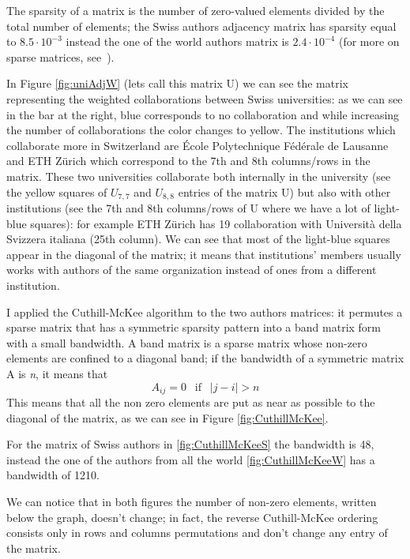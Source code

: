 \documentclass[]{usiinfbachelorproject}
\begin{document}
The sparsity of a matrix is the number of zero-valued elements divided by the total number of elements; the Swiss authors adjacency matrix has sparsity equal to $8.5 \cdot 10^{-3}$ instead the one of the world authors matrix is $2.4 \cdot 10^{-4}$ (for more on sparse matrices, see~\cite[Chapter 3]{saad}).

In Figure \ref{fig:uniAdjW} (lets call this matrix U) we can see the matrix representing the weighted collaborations between Swiss universities: as we can see in the bar at the right, blue corresponds to no collaboration and while increasing the number of collaborations the color changes to yellow.
The institutions which collaborate more in Switzerland are \'{E}cole Polytechnique F\'{e}d\'{e}rale de Lausanne and ETH Z\"{u}rich which correspond to the 7th and 8th columns/rows in the matrix. These two universities collaborate both internally in the university (see the yellow squares of $U_{7,7}$ and $U_{8,8}$ entries of the matrix U)  but also with other institutions (see the 7th and 8th columns/rows of U where we have a lot of light-blue squares): for example  ETH Z\"{u}rich has 19 collaboration with Universit\`{a} della Svizzera italiana (25th column). 
We can see that most of the light-blue squares appear in the diagonal of the matrix; it means that institutions' members usually works with authors of the same organization instead of ones from a different institution.

I applied the Cuthill-McKee algorithm to the two authors matrices: it permutes a sparse matrix that has a symmetric sparsity pattern into a band matrix form with a small bandwidth.
A band matrix is a sparse matrix whose non-zero elements are confined to a diagonal band; if the bandwidth of a symmetric matrix A is \textit{n}, it means that 
$$A_{ij} = 0  \:\: \text{ if } \:\: |j-i| > n$$
 This means that all the non zero elements are put as near as possible to the diagonal of the matrix, as we can see in Figure \ref{fig:CuthillMcKee}. 
 
For the matrix of Swiss authors in \ref{fig:CuthillMcKeeS} the bandwidth is 48, instead the one of the authors from all the world \ref{fig:CuthillMcKeeW} has a bandwidth of 1210. 

We can notice that in both figures the number of non-zero elements, written below the graph, doesn't change; in fact, the reverse Cuthill-McKee ordering consists only in rows and columns permutations and don't change any entry of the matrix.
\end{document}
